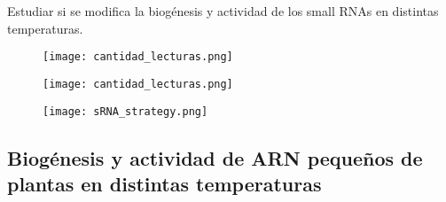 Estudiar si se modifica la biogénesis y actividad de los small RNAs en distintas temperaturas.


\begin{figure}[htbp!] 
    \centering    
    \texttt{[image: cantidad\_lecturas.png]}
    \caption[]{
    \textbf{}
   }
     \label{fig:secuencias_unicas}
\end{figure}


\begin{figure}[htbp!] 
    \centering    
    \texttt{[image: cantidad\_lecturas.png]}
    \caption[]{
    \textbf{}
   }
     \label{fig:secuencias_unicas}
\end{figure}


\begin{figure}[htbp!] 
    \centering    
    \texttt{[image: sRNA\_strategy.png]}
    \caption[]{
    \textbf{}
   }
     \label{fig:sRNA_strategy}
\end{figure}





\subsection{Biogénesis y actividad de ARN pequeños de plantas en distintas temperaturas}
